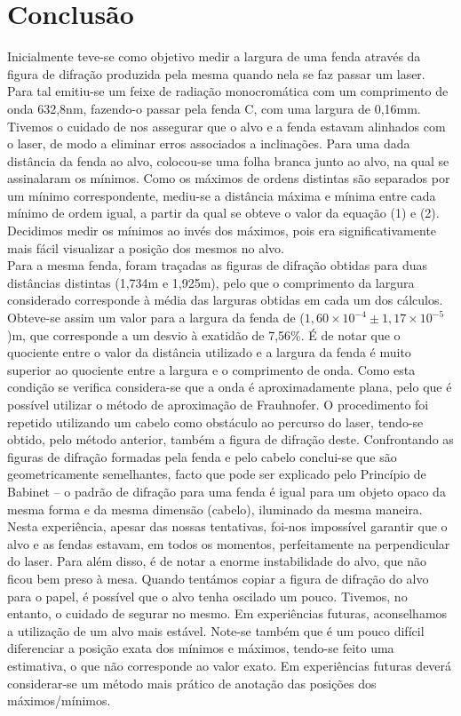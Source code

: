 \documentclass[10pt,a4paper]{article}
\begin{document}
{\section*{Conclusão}
Inicialmente teve-se como objetivo medir a largura de uma fenda através da figura de difração produzida pela mesma quando nela se faz passar um laser. Para tal emitiu-se um feixe de radiação monocromática com um comprimento de onda 632,8nm, fazendo-o passar pela fenda C, com uma largura de 0,16mm. Tivemos o cuidado de nos assegurar que o alvo e a fenda estavam alinhados com o laser, de modo a eliminar erros associados a inclinações. Para uma dada distância da fenda ao alvo, colocou-se uma folha branca junto ao alvo, na qual se assinalaram os mínimos. Como os máximos de ordens distintas são separados por um mínimo correspondente, mediu-se a distância máxima e mínima entre cada mínimo de ordem igual, a partir da qual se obteve o valor da equação (1) e (2). Decidimos medir os mínimos ao invés dos máximos, pois era significativamente mais fácil visualizar a posição dos mesmos no alvo.\\
Para a mesma fenda, foram traçadas as figuras de difração obtidas para duas distâncias distintas (1,734m e 1,925m), pelo que o comprimento da largura considerado corresponde à média das larguras obtidas em cada um dos cálculos. Obteve-se assim um valor para a largura da fenda de ($1,60\times10^{-4} \pm 1,17\times10^{-5}$)m, que corresponde a um desvio à exatidão de 7,56\%. 
É de notar que o quociente entre o valor da distância utilizado e a largura da fenda é muito superior ao quociente entre a largura e o comprimento de onda. Como esta condição se verifica considera-se que a onda é aproximadamente plana, pelo que é possível utilizar o método de aproximação de Frauhnofer.
O procedimento foi repetido utilizando um cabelo como obstáculo ao percurso do laser, tendo-se obtido, pelo método anterior, também a figura de difração deste. Confrontando as figuras de difração formadas pela fenda e pelo cabelo conclui-se que são geometricamente semelhantes, facto que pode ser explicado pelo Princípio de Babinet – o padrão de difração para uma fenda é igual para um objeto opaco da mesma forma e da mesma dimensão (cabelo), iluminado da mesma maneira.
Nesta experiência, apesar das nossas tentativas, foi-nos impossível garantir que o alvo e as fendas estavam, em todos os momentos, perfeitamente na perpendicular do laser. Para além disso, é de notar a enorme instabilidade do alvo, que não ficou bem preso à mesa. Quando tentámos copiar a figura de difração do alvo para o papel, é possível que o alvo tenha oscilado um pouco. Tivemos, no entanto, o cuidado de segurar no mesmo. Em experiências futuras, aconselhamos a utilização de um alvo mais estável. Note-se também que é um pouco difícil diferenciar a posição exata dos mínimos e máximos, tendo-se feito uma estimativa, o que não corresponde ao valor exato. Em experiências futuras deverá considerar-se um método mais prático de anotação das posições dos máximos/mínimos.
}
\end{document}
